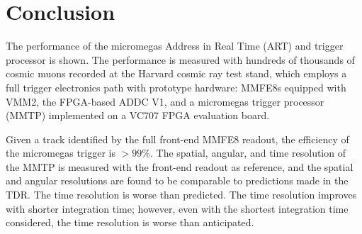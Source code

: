 \section{Conclusion}
\label{sec:conclusions}

The performance of the micromegas Address in Real Time (ART) and trigger processor is shown. The performance is measured with hundreds of thousands of cosmic muons recorded at the Harvard cosmic ray test stand, which employs a full trigger electronics path with prototype hardware: MMFE8s equipped with VMM2, the FPGA-based ADDC V1, and a micromegas trigger processor (MMTP) implemented on a VC707 FPGA evaluation board.

Given a track identified by the full front-end MMFE8 readout, the efficiency of the micromegas trigger is $>\! 99\%$. The spatial, angular, and time resolution of the MMTP is measured with the front-end readout as reference, and the spatial and angular resolutions are found to be comparable to predictions made in the TDR. The time resolution is worse than predicted. The time resolution improves with shorter integration time; however, even with the shortest integration time considered, the time resolution is worse than anticipated.

